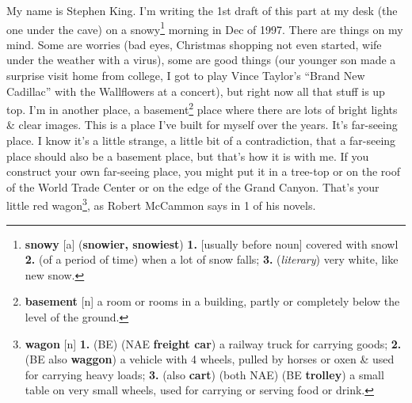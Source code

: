\documentclass[oneside]{book}
\numberwithin{equation}{section}
\begin{document}
My name is Stephen King. I'm writing the 1st draft of this part at my desk (the one under the cave) on a snowy\footnote{\textbf{snowy} [a] (\textbf{snowier, snowiest}) \textbf{1.} [usually before noun] covered with snowl \textbf{2.} (of a period of time) when a lot of snow falls; \textbf{3.} (\textit{literary}) very white, like new snow.} morning in Dec of 1997. There are things on my mind. Some are worries (bad eyes, Christmas shopping not even started, wife under the weather with a virus), some are good things (our younger son made a surprise visit home from college, I got to play Vince Taylor's ``Brand New Cadillac'' with the Wallflowers at a concert), but right now all that stuff is up top. I'm in another place, a basement\footnote{\textbf{basement} [n] a room or rooms in a building, partly or completely below the level of the ground.} place where there are lots of bright lights \& clear images. This is a place I've built for myself over the years. It's far-seeing place. I know it's a little strange, a little bit of a contradiction, that a far-seeing place should also be a basement place, but that's how it is with me. If you construct your own far-seeing place, you might put it in a tree-top or on the roof of the World Trade Center or on the edge of the Grand Canyon. That's your little red wagon\footnote{\textbf{wagon} [n] \textbf{1.} (BE) (NAE \textbf{freight car}) a railway truck for carrying goods; \textbf{2.} (BE also \textbf{waggon}) a vehicle with 4 wheels, pulled by horses or oxen \& used for carrying heavy loads; \textbf{3.} (also \textbf{cart}) (both NAE) (BE \textbf{trolley}) a small table on very small wheels, used for carrying or serving food or drink.}, as Robert McCammon says in 1 of his novels.
\end{document}
